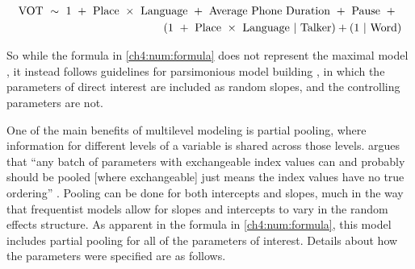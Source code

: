 \begin{equation}
  \begin{aligned}\label{ch4:num:formula}
    \text{VOT } \sim \text{ 1 } + \text{ Place } \times \text{ Language } + \text{ Average Phone Duration } + \text{ Pause } + \text{ } \\
    (\text{1 } + \text{ Place } \times \text{ Language }|\text{ Talker}) + (\text{1 }| \text{ Word}) \text{\medskip}
  \end{aligned}
\end{equation}

So while the formula in \ref{ch4:num:formula} does not represent the maximal model \citep{barr_2013_maximal}, it instead follows guidelines for parsimonious model building \citep{bates_2018_parsimonious}, in which the parameters of direct interest are included as random slopes, and the controlling parameters are not. 


One of the main benefits of multilevel modeling is partial pooling, where information for different levels of a variable is shared across those levels. \citeauthor{mcelreath_2020_sr} argues that ``any batch of parameters with exchangeable index values can and probably should be pooled [where exchangeable] just means the index values have no true ordering'' \citeyearpar[][p. 435]{mcelreath_2020_sr}. Pooling can be done for both intercepts and slopes, much in the way that frequentist models allow for slopes and intercepts to vary in the random effects structure. As apparent in the formula in \ref{ch4:num:formula}, this model includes partial pooling for all of the parameters of interest. Details about how the parameters were specified are as follows.  

